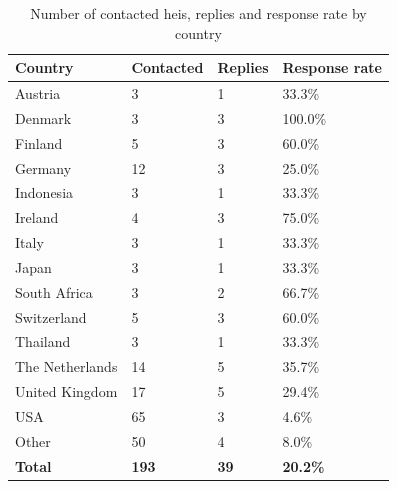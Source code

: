 \begin{table}[H]
\centering
\caption{Number of contacted \glspl{hei}, replies and response rate by country}
\label{contactedcountries}
\begin{tabular}{|l|l|l|l|}
\hline
\textbf{Country} & \textbf{Contacted} & \textbf{Replies} & \textbf{Response rate} \\ \hline
Austria          & 3                  & 1                & 33.3\%                 \\ \hline
Denmark          & 3                  & 3                & 100.0\%                \\ \hline
Finland          & 5                  & 3                & 60.0\%                 \\ \hline
Germany          & 12                 & 3                & 25.0\%                 \\ \hline
Indonesia        & 3                  & 1                & 33.3\%                 \\ \hline
Ireland          & 4                  & 3                & 75.0\%                 \\ \hline
Italy            & 3                  & 1                & 33.3\%                 \\ \hline
Japan            & 3                  & 1                & 33.3\%                 \\ \hline
South Africa     & 3                  & 2                & 66.7\%                 \\ \hline
Switzerland      & 5                  & 3                & 60.0\%                 \\ \hline
Thailand         & 3                  & 1                & 33.3\%                 \\ \hline
The Netherlands  & 14                 & 5                & 35.7\%                 \\ \hline
United Kingdom   & 17                 & 5                & 29.4\%                 \\ \hline
USA              & 65                 & 3                & 4.6\%                  \\ \hline
Other            & 50                 & 4                & 8.0\%                  \\ \hline
\textbf{Total}   & \textbf{193}       & \textbf{39}      & \textbf{20.2\%}        \\ \hline
\end{tabular}
\end{table}

